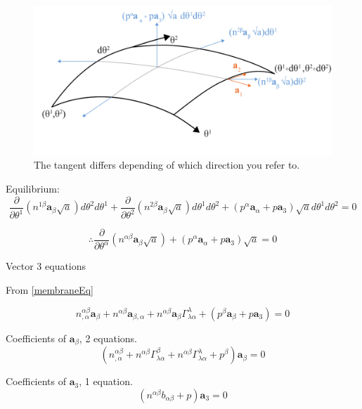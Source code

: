 \begin{figure}[H]
\centering
\includegraphics[width=0.9\linewidth ]{figure/Theory/membraneDefinition.pdf}
\caption{The tangent differs depending of which direction you refer to. }
\end{figure}


Equilibrium: 
\begin{equation}
\frac{\partial}{\partial \theta^1}(n^{1 \beta}\textbf{a}_{\beta} \sqrt{a}) d\theta^2 d\theta^1 + \frac{\partial}{\partial \theta^2}(n^{2 \beta}\textbf{a}_{\beta} \sqrt{a}) d\theta^1 d\theta^2 + ( p^{\alpha}\textbf{a}_\alpha + p\textbf{a}_3)\sqrt{a} d\theta^1 d\theta^2  = 0
\end{equation}



\begin{equation} \label{membraneEq}
\therefore  \frac{\partial}{\partial \theta^ \alpha} (n^{\alpha \beta} \textbf{a}_\beta \sqrt{ a}) + ( p^{\alpha}\textbf{a}_\alpha + p\textbf{a}_3)\sqrt{a} = 0
\end{equation}

Vector 3 equations

From \ref{membraneEq}

\begin{equation}
n^{\alpha \beta}_{,\alpha} \textbf{a}_\beta + n^{\alpha \beta}\textbf{a}_{\beta,\alpha} + n^{\alpha \beta}\textbf{a}_\beta \Gamma^\lambda_{\lambda \alpha} + (p^\beta \textbf{a}_\beta + p\textbf{a}_3) = 0
\end{equation}

Coefficients of $\textbf{a}_\beta$,  2 equations.
\begin{equation}
(n^{\alpha \beta}_{,\alpha} + n^{\alpha \beta}\Gamma^\beta_{\lambda \alpha} + n^{\alpha \beta}\Gamma^\lambda_{\lambda \alpha} + p^\beta) \textbf{a}_\beta = 0 
\end{equation}

Coefficients of $\textbf{a}_3$,  1 equation.
\begin{equation}
(n^{\alpha \beta} b_{\alpha \beta} + p)\textbf{a}_3 = 0
\end{equation}

